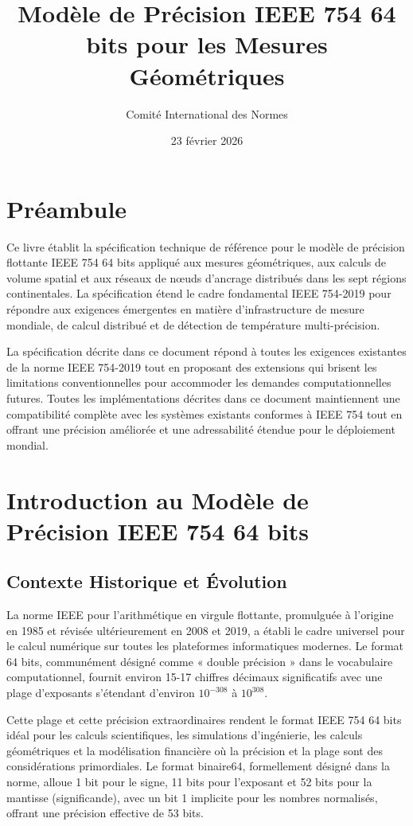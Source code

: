 \documentclass[12pt]{book}
\title{Modèle de Précision IEEE 754 64 bits pour les Mesures Géométriques}
\author{Comité International des Normes}
\date{23 février 2026}
\begin{document}
\frontmatter
\maketitle

\chapter*{Préambule}
Ce livre établit la spécification technique de référence pour le modèle de précision flottante IEEE 754 64 bits appliqué aux mesures géométriques, aux calculs de volume spatial et aux réseaux de nœuds d'ancrage distribués dans les sept régions continentales. La spécification étend le cadre fondamental IEEE 754-2019 pour répondre aux exigences émergentes en matière d'infrastructure de mesure mondiale, de calcul distribué et de détection de température multi-précision.

La spécification décrite dans ce document répond à toutes les exigences existantes de la norme IEEE 754-2019 tout en proposant des extensions qui brisent les limitations conventionnelles pour accommoder les demandes computationnelles futures. Toutes les implémentations décrites dans ce document maintiennent une compatibilité complète avec les systèmes existants conformes à IEEE 754 tout en offrant une précision améliorée et une adressabilité étendue pour le déploiement mondial.

\tableofcontents

\mainmatter

\chapter{Introduction au Modèle de Précision IEEE 754 64 bits}

\section{Contexte Historique et Évolution}

La norme IEEE pour l'arithmétique en virgule flottante, promulguée à l'origine en 1985 et révisée ultérieurement en 2008 et 2019, a établi le cadre universel pour le calcul numérique sur toutes les plateformes informatiques modernes. Le format 64 bits, communément désigné comme « double précision » dans le vocabulaire computationnel, fournit environ 15-17 chiffres décimaux significatifs avec une plage d'exposants s'étendant d'environ $10^{-308}$ à $10^{308}$.

Cette plage et cette précision extraordinaires rendent le format IEEE 754 64 bits idéal pour les calculs scientifiques, les simulations d'ingénierie, les calculs géométriques et la modélisation financière où la précision et la plage sont des considérations primordiales. Le format binaire64, formellement désigné dans la norme, alloue 1 bit pour le signe, 11 bits pour l'exposant et 52 bits pour la mantisse (significande), avec un bit 1 implicite pour les nombres normalisés, offrant une précision effective de 53 bits.
\end{document}
